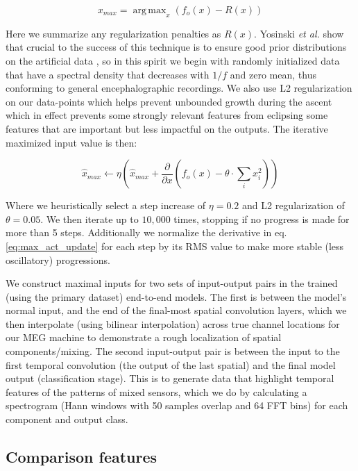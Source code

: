 \documentclass[fleqn,10pt]{wlscirep}
\DeclareMathOperator*{\argmaxA}{arg\,max}
\begin{document}
\begin{equation} \label{eq:max_act}
  x_{max} = \argmaxA_x(f_o(x) - R(x))
\end{equation}

Here we summarize any regularization penalties as $R(x)$. Yosinski {\em et al.} show that crucial to the success of this technique is to ensure good prior distributions on the artificial data \cite{Yosinski2015}, so in this spirit we begin with randomly initialized data that have a spectral density that decreases with $1/f$ and zero mean, thus conforming to general encephalographic recordings. We also use L2 regularization on our data-points which helps prevent unbounded growth during the ascent which in effect prevents some strongly relevant features from eclipsing some features that are important but less impactful on the outputs. The iterative maximized input value is then:

\begin{equation} \label{eq:max_act_update}
  \hat{x}_{max} \leftarrow \eta \left(\hat{x}_{max} + \frac{\partial }{\partial x}(f_o(x) - \theta \cdot {}\sum_ix_i^2) \right)
\end{equation}

Where we heuristically select a step increase of $\eta = 0.2$ and L2 regularization of $\theta = 0.05$. We then iterate up to $10,000$ times, stopping if no progress is made for more than 5 steps. Additionally we normalize the derivative in eq. \ref{eq:max_act_update} for each step by its RMS value to make more stable (less oscillatory) progressions.

We construct maximal inputs for two sets of input-output pairs in the trained (using the primary dataset) end-to-end models. The first is between the model's normal input, and the end of the final-most spatial convolution layers, which we then interpolate (using bilinear interpolation) across true channel locations for our MEG machine to demonstrate a rough localization of spatial components/mixing. The second input-output pair is between the input to the first temporal convolution (the output of the last spatial) and the final model output (classification stage). This is to generate data that highlight temporal features of the patterns of mixed sensors, which we do by calculating a spectrogram (Hann windows with 50 samples overlap and 64 FFT bins) for each component and output class.

\subsection*{Comparison features}
\end{document}
